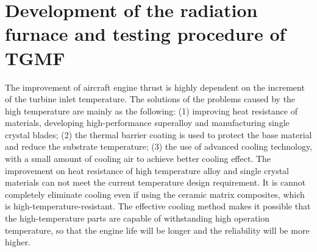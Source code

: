 \chapter{Development of the radiation furnace and testing procedure of TGMF}
\noindent
The improvement of aircraft engine thrust is highly dependent on the increment of the turbine inlet temperature.
The solutions of the problems caused by the high temperature are mainly as the following:
(1) improving heat resistance of materials, developing high-performance superalloy and manufacturing single crystal blades;
(2) the thermal barrier coating is used to protect the base material and reduce the substrate temperature;
(3) the use of advanced cooling technology, with a small amount of cooling air to achieve better cooling effect.
The improvement on heat resistance of high temperature alloy and single crystal materials can not meet the current temperature design requirement. It is cannot completely eliminate cooling even if using the ceramic matrix composites, which is high-temperature-resistant. The effective cooling method makes it possible that the high-temperature parts are capable of withstanding high operation temperature, so that the engine life will be longer and the reliability will be more higher.

